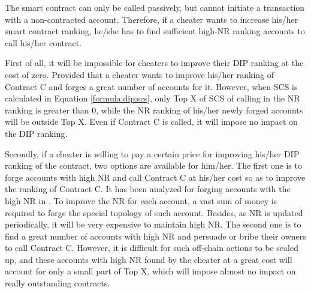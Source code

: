 The smart contract can only be called passively, but cannot initiate a transaction with a non-contracted account. Therefore, if a cheater wants to increase his/her smart contract ranking, he/she has to find sufficient high-NR ranking accounts to call his/her contract.


First of all, it will be impossible for cheaters to improve their DIP ranking at the cost of zero. Provided that a cheater wants to improve his/her ranking of Contract C and forges a great number of accounts for it. However, when SCS is calculated in Equation \ref{formula:dip:scs}, only Top X of SCS of calling in the NR ranking is greater than 0, while the NR ranking of his/her newly forged accounts will be outside Top X. Even if Contract C is called, it will impose no impact on the DIP ranking.


Secondly, if a cheater is willing to pay a certain price for improving his/her DIP ranking of the contract, two options are available for him/her. The first one is to forge accounts with high NR and call Contract C at his/her cost so as to improve the ranking of Contract C. It has been analyzed for forging accounts with the high NR in . To improve the NR for each account, a vast sum of money is required to forge the special topology of such account. Besides, as NR is updated periodically, it will be very expensive to maintain high NR. The second one is to find a great number of accounts with high NR and persuade or bribe their owners to call Contract C. However, it is difficult for such off-chain actions to be scaled up, and these accounts with high NR found by the cheater at a great cost will account for only a small part of Top X, which will impose almost no impact on really outstanding contracts.


